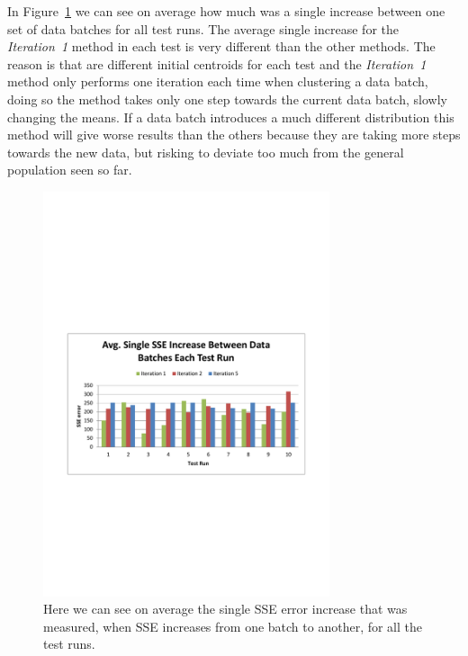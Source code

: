 In Figure~\ref{fig:results_AvgIncreaseEachTestRun} we can see on average how much was a single increase between one set of data batches for all test runs. The average single increase for the \textit{Iteration~1} method in each test is very different than the other methods. The reason is that are different initial centroids for each test and the \textit{Iteration~1} method only performs one iteration each time when clustering a data batch, doing so the method takes only one step towards the current data batch, slowly changing the means. If a data batch introduces a much different distribution this method will give worse results than the others because they are taking more steps towards the new data, but risking to deviate too much from the general population seen so far.


\begin{figure}[ht]
\centering
\includegraphics[trim = 10mm 90mm 10mm 100mm, clip, width=0.75\textwidth]{Figures/experiments/zdataWO_AvgSingleSSEIncreaseBetweenDataBatchesEachTestRun.pdf}
\caption{Here we can see on average the single SSE error increase that was measured, when SSE increases from one batch to another, for all the test runs.}
\label{fig:results_AvgIncreaseEachTestRun}
\end{figure}


